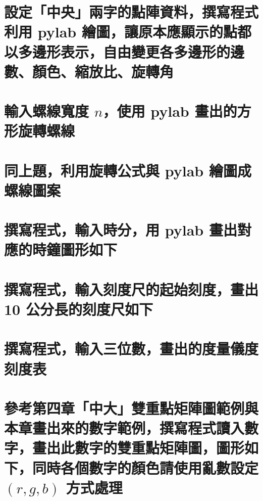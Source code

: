 \section{設定「中央」兩字的點陣資料，撰寫程式利用 pylab 繪圖，讓原本應顯示的點都以多邊形表示，自由變更各多邊形的邊數、顏色、縮放比、旋轉角}


\section{輸入螺線寬度 $n$，使用 pylab 畫出的方形旋轉螺線}


\section{同上題，利用旋轉公式與 pylab 繪圖成螺線圖案}


\section{撰寫程式，輸入時分，用 pylab 畫出對應的時鐘圖形如下}


\section{撰寫程式，輸入刻度尺的起始刻度，畫出 10 公分長的刻度尺如下}


\section{撰寫程式，輸入三位數，畫出的度量儀度刻度表}


\section{參考第四章「中大」雙重點矩陣圖範例與本章畫出來的數字範例，撰寫程式讀入數字，畫出此數字的雙重點矩陣圖，圖形如下，同時各個數字的顏色請使用亂數設定 $(r,g,b)$ 方式處理}

